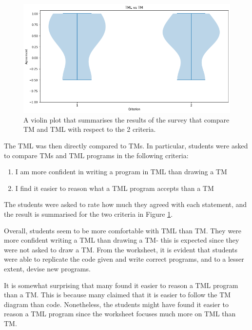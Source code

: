 \begin{figure}[htb]
    \centering
    \includegraphics[scale=0.35]{data/tml-v-tm.png}
    \caption{A violin plot that summarises the results of the survey that compare TM and TML with respect to the 2 criteria.}
    \label{fig:tml-v-tm}
\end{figure}

The TML was then directly compared to TMs. In particular, students were asked to compare TMs and TML programs in the following criteria:
\begin{enumerate}
    \item I am more confident in writing a program in TML than drawing a TM
    \item I find it easier to reason what a TML program accepts than a TM
\end{enumerate}
The students were asked to rate how much they agreed with each statement, and the result is summarised for the two criteria in Figure \ref{fig:tml-v-tm}. 

Overall, students seem to be more comfortable with TML than TM. They were more confident writing a TML than drawing a TM- this is expected since they were not asked to draw a TM. From the worksheet, it is evident that students were able to replicate the code given and write correct programs, and to a lesser extent, devise new programs.

It is somewhat surprising that many found it easier to reason a TML program than a TM. This is because many claimed that it is easier to follow the TM diagram than code. Nonetheless, the students might have found it easier to reason a TML program since the worksheet focuses much more on TML than TM.

